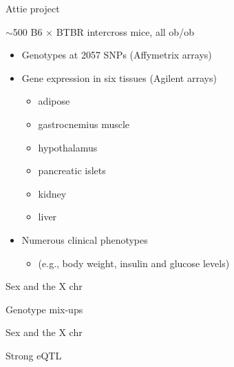 \documentclass[12pt,t]{beamer}
\begin{document}
\begin{frame}[c]{Attie project}


{\hilit
$\sim$500 B6 $\times$ BTBR intercross mice, all ob/ob }

\vspace{6pt}

\begin{itemize}
\itemsep12pt
\item Genotypes at 2057 SNPs (Affymetrix arrays)

\item Gene expression in six tissues (Agilent arrays)

  \begin{itemize}
    \item adipose
    \item gastrocnemius muscle
    \item hypothalamus
    \item pancreatic islets
    \item kidney
    \item liver
  \end{itemize}

\item Numerous clinical phenotypes
  \begin{itemize}
    \item[] (e.g., body weight, insulin and glucose levels)
  \end{itemize}

\end{itemize}

\note{}

\end{frame}




\begin{frame}[c]{Sex and the X chr}
\note{}
\end{frame}


\begin{frame}[c]{Genotype mix-ups}
\note{}
\end{frame}


\begin{frame}[c]{Sex and the X chr}
\note{}
\end{frame}


\begin{frame}[c]{Strong eQTL}
\note{}
\end{frame}
\end{document}
